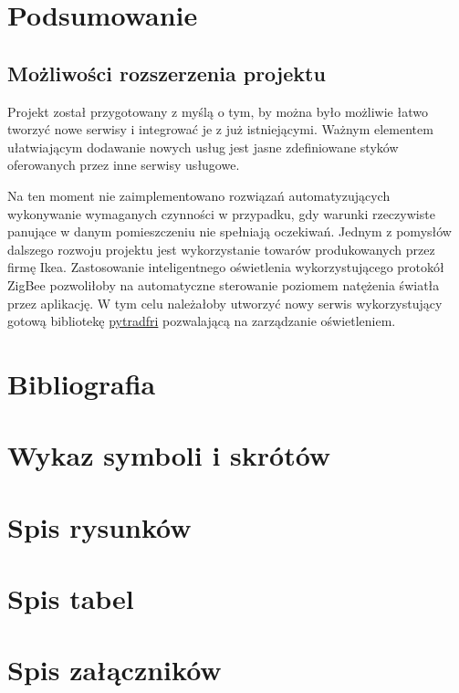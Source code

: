 \documentclass[11pt, a4]{article} %
\begin{document}
\section{Podsumowanie}
\subsection{Możliwości rozszerzenia projektu}

Projekt został przygotowany z myślą o tym, by można było możliwie łatwo tworzyć nowe 
serwisy i integrować je z już istniejącymi. Ważnym elementem ułatwiającym dodawanie 
nowych usług jest jasne zdefiniowane styków oferowanych przez inne serwisy usługowe. 

Na ten moment nie zaimplementowano rozwiązań automatyzujących wykonywanie wymaganych 
czynności w przypadku, gdy warunki rzeczywiste panujące w danym pomieszczeniu nie 
spełniają oczekiwań. Jednym z pomysłów dalszego rozwoju projektu jest wykorzystanie 
towarów produkowanych przez firmę Ikea. Zastosowanie inteligentnego oświetlenia 
wykorzystującego protokół ZigBee pozwoliłoby na automatyczne sterowanie poziomem 
natężenia światła przez aplikację. W tym celu należałoby utworzyć nowy serwis 
wykorzystujący gotową bibliotekę \href{https://github.com/home-assistant-libs/pytradfri}{pytradfri} 
pozwalającą na zarządzanie oświetleniem.


\section{Bibliografia}
\printbibliography
\section{Wykaz symboli i skrótów}
\section{Spis rysunków}
\section{Spis tabel}
\section{Spis załączników}
\end{document}
